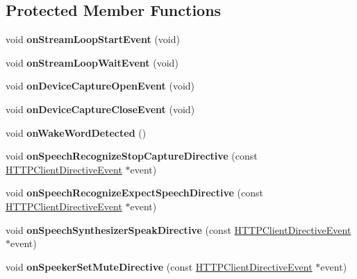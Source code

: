 \subsection*{Protected Member Functions}
\begin{DoxyCompactItemize}
\item 
\mbox{\label{classAVSController_a0f68ded5ebd1d728ca56e61a46ede630}} 
void {\bfseries on\+Stream\+Loop\+Start\+Event} (void)
\item 
\mbox{\label{classAVSController_a67d0ffd826dc595aa23e8fdfe3e45422}} 
void {\bfseries on\+Stream\+Loop\+Wait\+Event} (void)
\item 
\mbox{\label{classAVSController_a93119243f11d797554d6a175f30ff391}} 
void {\bfseries on\+Device\+Capture\+Open\+Event} (void)
\item 
\mbox{\label{classAVSController_aca4f642e82b469cda941822ab74770c5}} 
void {\bfseries on\+Device\+Capture\+Close\+Event} (void)
\item 
\mbox{\label{classAVSController_a149bd119bb25bf57850ac9978158d408}} 
void {\bfseries on\+Wake\+Word\+Detected} ()
\item 
\mbox{\label{classAVSController_a81ab91d6a582db9636a82b3c9f620e63}} 
void {\bfseries on\+Speech\+Recognize\+Stop\+Capture\+Directive} (const \hyperlink{classNetwork_1_1HTTP_1_1HTTPClientDirectiveEvent}{H\+T\+T\+P\+Client\+Directive\+Event} $\ast$event)
\item 
\mbox{\label{classAVSController_a9fa9fb34684b7ea46f97926fbabbd31d}} 
void {\bfseries on\+Speech\+Recognize\+Expect\+Speech\+Directive} (const \hyperlink{classNetwork_1_1HTTP_1_1HTTPClientDirectiveEvent}{H\+T\+T\+P\+Client\+Directive\+Event} $\ast$event)
\item 
\mbox{\label{classAVSController_ae6275a874383c8be50efbc4b420eaab2}} 
void {\bfseries on\+Speech\+Synthesizer\+Speak\+Directive} (const \hyperlink{classNetwork_1_1HTTP_1_1HTTPClientDirectiveEvent}{H\+T\+T\+P\+Client\+Directive\+Event} $\ast$event)
\item 
\mbox{\label{classAVSController_a9226e5badeb17e54fa2cb32f9973cc89}} 
void {\bfseries on\+Speeker\+Set\+Mute\+Directive} (const \hyperlink{classNetwork_1_1HTTP_1_1HTTPClientDirectiveEvent}{H\+T\+T\+P\+Client\+Directive\+Event} $\ast$event)
\end{DoxyCompactItemize}


